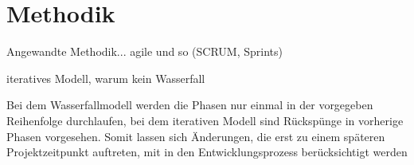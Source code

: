 \chapter{Methodik}
	
	Angewandte Methodik... agile und so (SCRUM, Sprints)
	
	iteratives Modell, warum kein Wasserfall
	
	Bei dem Wasserfallmodell werden die Phasen nur einmal in der vorgegeben Reihenfolge durchlaufen, bei dem iterativen Modell sind Rückspünge in vorherige Phasen vorgesehen. Somit lassen sich Änderungen, die erst zu einem späteren Projektzeitpunkt auftreten, mit in den Entwicklungsprozess berücksichtigt werden 